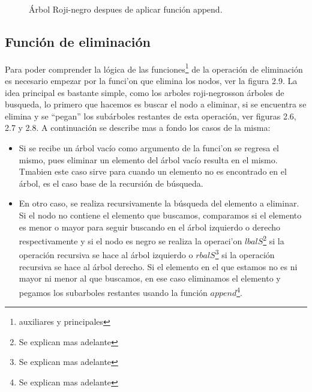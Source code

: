 \documentclass[letterpaper,12pt,oneside]{book}
\newcommand{\Arn}{Árbol Roji-negro}
\newcommand{\arns}{arboles roji-negros}
\theoremstyle{plain}
\theoremstyle{definition}
\theoremstyle{remark}
\begin{document}
\begin{figure}
\centering 
\captionsetup{justification=centering}
\label{arbolRB}
\caption{{\Arn} despues de aplicar función append.}
\end{figure}

\subsection{Funci\'on de eliminaci\'on}

Para poder comprender la l\'ogica de las funciones\footnote{auxiliares y principales} de la operaci\'on
de eliminaci\'on es necesario empezar por la funci'on que elimina los nodos, ver la figura 2.9. La idea 
principal es bastante simple, como los \arns son \'arboles de busqueda, lo primero que hacemos es buscar 
el nodo a eliminar, si se encuentra se elimina y se ``pegan'' los subárboles restantes de esta 
operaci\'on, ver figuras 2.6, 2.7 y 2.8. A continuaci\'on se describe mas a fondo los casos de la misma:

\begin{itemize}
    \item Si se recibe un \'arbol vacío como argumento de la funci'on se regresa el mismo, pues eliminar 
    un elemento del \'arbol vacío resulta en el mismo. Tmabien este caso sirve para cuando un elemento no
    es encontrado en el \'arbol, es el caso base de la recursi\'on de búsqueda.
    \item En otro caso, se realiza recursivamente la búsqueda del elemento a eliminar. Si el nodo no 
    contiene el elemento que buscamos, comparamos si el elemento es menor o mayor para seguir buscando en
    el \'arbol izquierdo o derecho respectivamente y si el nodo es negro se realiza la operaci'on 
    $lbalS$\footnote{Se explican mas adelante} si la operación recursiva se hace al árbol izquierdo o 
    $rbalS$\footnote{Se explican mas adelante} si la operación recursiva se hace al árbol derecho. Si el 
    elemento en el que estamos no es ni mayor ni menor al que buscamos, en ese caso eliminamos el 
    elemento y pegamos los subarboles restantes usando la función $append$\footnote{Se explican mas 
    adelante}.
\end{itemize}
\end{document}
